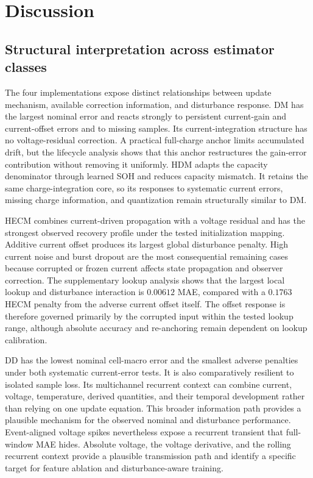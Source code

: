 \section{Discussion}

\subsection{Structural interpretation across estimator classes}

The four implementations expose distinct relationships between update mechanism, available correction information, and disturbance response. DM has the largest nominal error and reacts strongly to persistent current-gain and current-offset errors and to missing samples. Its current-integration structure has no voltage-residual correction. A practical full-charge anchor limits accumulated drift, but the lifecycle analysis shows that this anchor restructures the gain-error contribution without removing it uniformly. HDM adapts the capacity denominator through learned SOH and reduces capacity mismatch. It retains the same charge-integration core, so its responses to systematic current errors, missing charge information, and quantization remain structurally similar to DM.

HECM combines current-driven propagation with a voltage residual and has the strongest observed recovery profile under the tested initialization mapping. Additive current offset produces its largest global disturbance penalty. High current noise and burst dropout are the most consequential remaining cases because corrupted or frozen current affects state propagation and observer correction. The supplementary lookup analysis shows that the largest local lookup and disturbance interaction is $0.00612$ MAE, compared with a $0.1763$ HECM penalty from the adverse current offset itself. The offset response is therefore governed primarily by the corrupted input within the tested lookup range, although absolute accuracy and re-anchoring remain dependent on lookup calibration.

DD has the lowest nominal cell-macro error and the smallest adverse penalties under both systematic current-error tests. It is also comparatively resilient to isolated sample loss. Its multichannel recurrent context can combine current, voltage, temperature, derived quantities, and their temporal development rather than relying on one update equation. This broader information path provides a plausible mechanism for the observed nominal and disturbance performance. Event-aligned voltage spikes nevertheless expose a recurrent transient that full-window MAE hides. Absolute voltage, the voltage derivative, and the rolling recurrent context provide a plausible transmission path and identify a specific target for feature ablation and disturbance-aware training.

